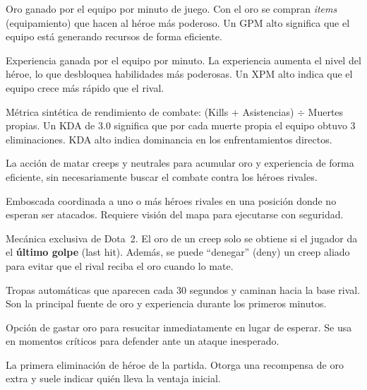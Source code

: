 \documentclass[12pt,a4paper]{article}
\begin{document}
\begin{description}[leftmargin=3.8cm, style=nextline, itemsep=5pt]
  \item[GPM (Gold Per Minute)] Oro ganado por el equipo por minuto de juego.
    Con el oro se compran \textit{items} (equipamiento) que hacen al h\'eroe
    m\'as poderoso. Un GPM alto significa que el equipo est\'a generando recursos
    de forma eficiente.

  \item[XPM (Experience Per Minute)] Experiencia ganada por el equipo por
    minuto. La experiencia aumenta el nivel del h\'eroe, lo que desbloquea
    habilidades m\'as poderosas. Un XPM alto indica que el equipo crece m\'as
    r\'apido que el rival.

  \item[KDA (Kills / Deaths / Assists)] M\'etrica sint\'etica de rendimiento de
    combate: (Kills + Asistencias) $\div$ Muertes propias. Un KDA de 3.0 significa
    que por cada muerte propia el equipo obtuvo 3 eliminaciones. KDA alto indica
    dominancia en los enfrentamientos directos.

  \item[Farm / Farmear] La acci\'on de matar creeps y neutrales para acumular
    oro y experiencia de forma eficiente, sin necesariamente buscar el combate
    contra los h\'eroes rivales.

  \item[Gank] Emboscada coordinada a uno o m\'as h\'eroes rivales en una posici\'on
    donde no esperan ser atacados. Requiere visi\'on del mapa para ejecutarse
    con seguridad.

  \item[Last Hit / Deny] Mec\'anica exclusiva de Dota~2. El oro de un creep solo
    se obtiene si el jugador da el \textbf{\'ultimo golpe} (last hit). Adem\'as,
    se puede ``denegar'' (deny) un creep aliado para evitar que el rival
    reciba el oro cuando lo mate.

  \item[Creeps / Minions] Tropas autom\'aticas que aparecen cada 30 segundos y
    caminan hacia la base rival. Son la principal fuente de oro y experiencia
    durante los primeros minutos.

  \item[Buyback] Opci\'on de gastar oro para resucitar inmediatamente en lugar de
    esperar. Se usa en momentos cr\'iticos para defender ante un ataque inesperado.

  \item[First Blood] La primera eliminaci\'on de h\'eroe de la partida. Otorga
    una recompensa de oro extra y suele indicar qui\'en lleva la ventaja inicial.


\end{description}
\end{document}
